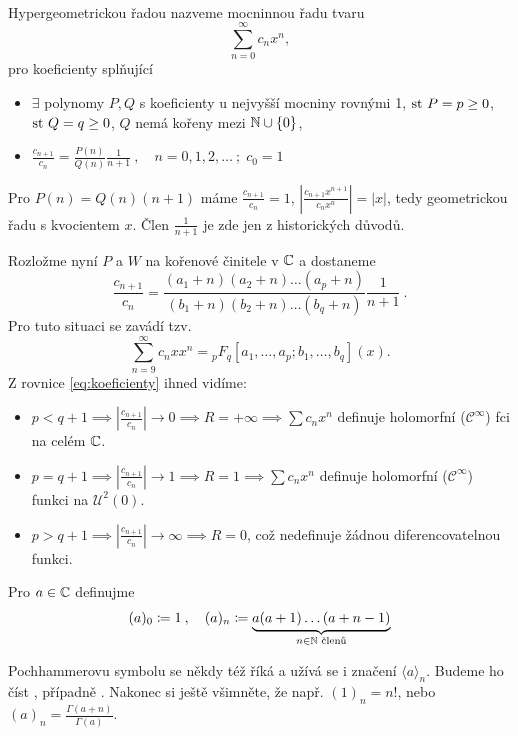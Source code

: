 \newpage
\hrulefill\\

\begin{definition}
    Hypergeometrickou řadou nazveme mocninnou řadu tvaru
    $$\sum\limits_{n=0}^\infty c_nx^n,$$
    pro koeficienty splňující
    \begin{itemize}
        \item $\exists$ polynomy $P,Q$ s koeficienty u nejvyšší mocniny rovnými 1, $\operatorname{st}\, P=p\geq0$, $\operatorname{st}\, Q=q\geq0$, $Q$ nemá kořeny mezi $\mathbb{N}\cup\{0\}$,
        \item $\frac{c_{n+1}}{c_n}=\frac{P(n)}{Q(n)}\frac{1}{n+1}\:,\quad n=0,1,2,\dots\:;\; c_0=1$
    \end{itemize}
\end{definition}

\begin{remark}
    Pro $P(n)=Q(n)(n+1)$ máme $\frac{c_{n+1}}{c_n}=1$, $\left|\frac{c_{n+1}x^{n+1}}{c_nx^n}\right|=|x|$, tedy geometrickou řadu s kvocientem $x$. Člen $\frac{1}{n+1}$ je zde jen z historických důvodů.
\end{remark}
Rozložme nyní $P$ a $W$ na kořenové činitele v $\mathbb{C}$ a dostaneme
\begin{equation}
    \frac{c_{n+1}}{c_n} = \frac{(a_1+n)(a_2+n)\dots(a_p+n)}{(b_1+n)(b_2+n)\dots(b_q+n)}\frac{1}{n+1}\:.    
    \label{eq:koeficienty}
\end{equation}
Pro tuto situaci se zavádí tzv. 
$$\sum\limits_{n=9}^\infty c_nxx^n = {}_pF_q[a_1,\dots,a_p;b_1,\dots,b_q](x).$$
Z rovnice \ref{eq:koeficienty} ihned vidíme:
\begin{itemize}
    \item $p<q+1\implies \left|\frac{c_{n+1}}{c_n}\right| \rightarrow 0\implies R=+\infty\implies \sum c_nx^n$ definuje holomorfní ($\mathcal{C}^\infty$) fci na celém $\mathbb{C}$.
    \item $p=q+1\implies \left|\frac{c_{n+1}}{c_n}\right| \rightarrow 1\implies R=1\implies \sum c_nx^n$ definuje holomorfní ($\mathcal{C}^\infty$) funkci na $\mathcal{U}^2(0)$.
    \item $p>q+1\implies \left|\frac{c_{n+1}}{c_n}\right| \rightarrow \infty\implies R=0$, což nedefinuje žádnou diferencovatelnou funkci.
\end{itemize}
\begin{definition}
    Pro $a\in\mathbb{C}$ definujme 
    \begin{align*}
        (a)_0 \coloneqq 1\:,\quad   (a)_n\coloneqq \underbrace{a(a+1)\dots(a+n-1)}_{n\in\mathbb{N} \text{ členů}}
    \end{align*}
\end{definition}
Pochhammerovu symbolu se někdy též říká  a užívá se i značení $\langle a\rangle_n$. Budeme ho číst , případně . Nakonec si ještě všimněte, že např. $(1)_n=n!$, nebo $(a)_n=\frac{\Gamma(a+n)}{\Gamma(a)}$.

